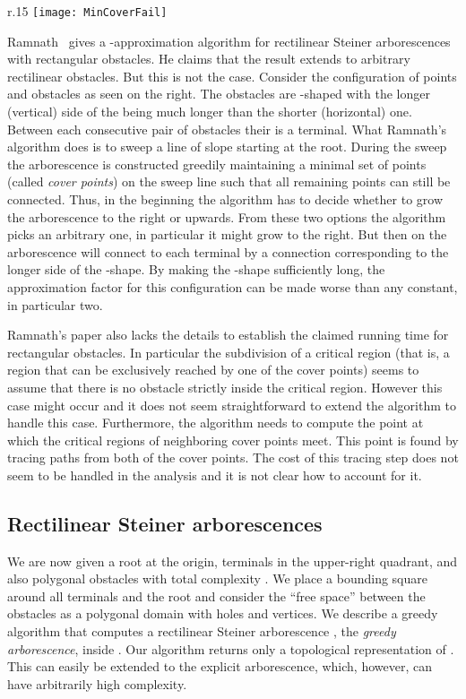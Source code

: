 \documentclass{journalA4}
\begin{document}
\begin{wrapfigure}[7]{r}{.15\textwidth}
  \centering
  \texttt{[image: MinCoverFail]}
\end{wrapfigure}
Ramnath~\cite{Ramnath03} gives a -approximation algorithm for rectilinear Steiner arborescences with rectangular obstacles. He claims that the result extends to arbitrary rectilinear obstacles. But this is not the case. Consider the configuration of points and obstacles as seen on the right. The obstacles are -shaped with the longer (vertical) side of the  being much longer than the shorter (horizontal) one. Between each consecutive pair of obstacles their is a terminal. What Ramnath's algorithm does is to sweep a line of slope  starting at the root. During the sweep the arborescence is constructed greedily maintaining a minimal set of points (called \emph{cover points}) on the sweep line such that all remaining points can still be connected. Thus, in the beginning the algorithm has to decide whether to grow the arborescence to the right or upwards. From these two options the algorithm picks an arbitrary one, in particular it might grow to the right. But then on the arborescence will connect to each terminal by a connection corresponding to the longer side of the -shape. By making the -shape sufficiently long, the approximation factor for this configuration can be made worse than any constant, in particular two.

Ramnath's paper also lacks the details to establish the claimed running time for rectangular obstacles. In particular the subdivision of a critical region (that is, a region that can be exclusively reached by one of the cover points) seems to assume that there is no obstacle strictly inside the critical region. However this case might occur and it does not seem straightforward to extend the algorithm to handle this case. Furthermore, the algorithm needs to compute the point at which the critical regions of neighboring cover points meet. This point is found by tracing paths from both of the cover points. The cost of this tracing step does not seem to be handled in the analysis and it is not clear how to account for it.

\subsection{Rectilinear Steiner arborescences}\label{sec:rectisweep}

We are now given a root  at the origin, terminals  in the upper-right quadrant, and also  polygonal obstacles  with total complexity . We place a bounding square around all terminals and the root and consider the ``free space'' between the obstacles as a polygonal domain  with  holes and  vertices. We describe a greedy algorithm that computes a rectilinear Steiner arborescence , the \emph{greedy arborescence}, inside . Our algorithm returns only a topological representation of . This can easily be extended to the explicit arborescence, which, however, can have arbitrarily high complexity.
\end{document}
